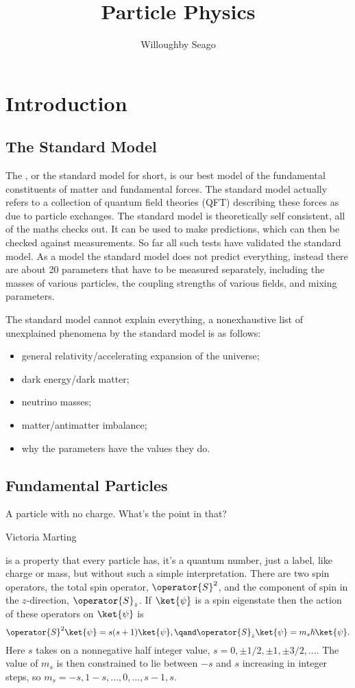 \documentclass[fleqn]{NotesClass}
\title{Particle Physics}
\author{Willoughby Seago}
\date{}
\begin{document}
    \frontmatter
    \titlepage
    \innertitlepage{}
    \tableofcontents
    \listoffigures
    \mainmatter
    
    \chapter{Introduction}
    \section{The Standard Model}
    The , or the standard model for short, is our best model of the fundamental constituents of matter and fundamental forces.
    The standard model actually refers to a collection of quantum field theories (QFT) describing these forces as due to particle exchanges.
    The standard model is theoretically self consistent, all of the maths checks out.
    It can be used to make predictions, which can then be checked against measurements.
    So far all such tests have validated the standard model.
    As a model the standard model does not predict everything, instead there are about 20 parameters that have to be measured separately, including the masses of various particles, the coupling strengths of various fields, and mixing parameters.
    
    The standard model cannot explain everything, a nonexhaustive list of unexplained phenomena by the standard model is as follows:
    \begin{itemize}
        \item general relativity/accelerating expansion of the universe;
        \item dark energy/dark matter;
        \item neutrino masses;
        \item matter/antimatter imbalance;
        \item why the parameters have the values they do.
    \end{itemize}
    
    \section{Fundamental Particles}
    \epigraph{A particle with no charge. What's the point in that?}{Victoria Marting}
     is a property that every particle has, it's a quantum number, just a label, like charge or mass, but without such a simple interpretation.
    There are two spin operators, the total spin operator, \(\operator{S}^2\), and the component of spin in the \(z\)-direction, \(\operator{S}_z\).
    If \(\ket{\psi}\) is a spin eigenstate then the action of these operators on \(\ket{\psi}\) is
    \begin{equation}
        \operator{S}^2 \ket{\psi} = s(s + 1)\ket{\psi}, \qand \operator{S}_z \ket{\psi} = m_s \hbar \ket{\psi}.
    \end{equation}
    Here \(s\) takes on a nonnegative half integer value, \(s = 0, \pm 1/2, \pm 1, \pm 3/2, \dotsc\).
    The value of \(m_s\) is then constrained to lie between \(-s\) and \(s\) increasing in integer steps, so \(m_s = -s, 1 - s, \dotsc, 0, \dotsc, s - 1, s\).
    
\end{document}
